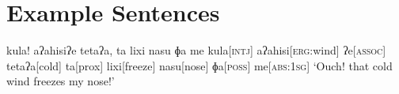 \appendix
\chapter{Example Sentences}

\ex
\begingl
\glpreamble kula! aʔahisiʔe tetaʔa, ta lixi nasu ɸa me\endpreamble
kula[\textsc{intj}]
aʔahisi[\textsc{erg:}wind]
ʔe[\textsc{assoc}]
tetaʔa[cold]
ta[prox]
lixi[freeze]
nasu[nose]
ɸa[\textsc{poss}]
me[\textsc{abs:1sg}]
\glft `Ouch! that cold wind freezes my nose!'
\endgl
\xe
